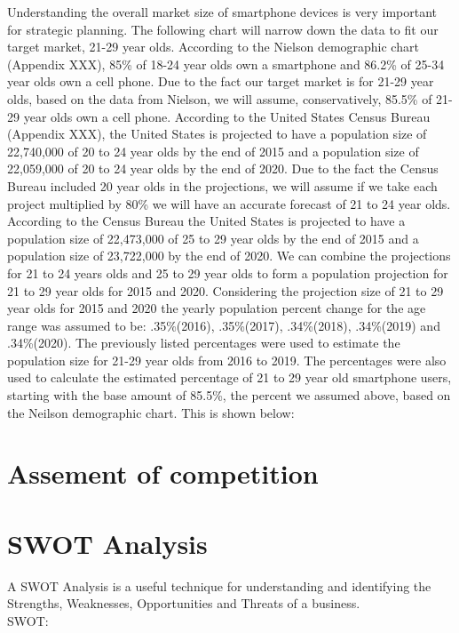 

Understanding the overall market size of smartphone devices is very important for strategic planning. The following chart will narrow down the data to fit our target market, 21-29 year olds. According to the Nielson demographic chart (Appendix XXX), 85\% of 18-24 year olds own a smartphone and 86.2\% of 25-34 year olds own a cell phone. Due to the fact our target market is for 21-29 year olds, based on the data from Nielson, we will assume, conservatively, 85.5\% of 21-29 year olds own a cell phone. According to the United States Census Bureau (Appendix XXX), the United States is projected to have a population size of 22,740,000 of 20 to 24 year olds by the end of 2015 and a population size of 22,059,000 of 20 to 24 year olds by the end of 2020. Due to the fact the Census Bureau included 20 year olds in the projections, we will assume if we take each project multiplied by 80\% we will have an accurate forecast of 21 to 24 year olds. According to the Census Bureau the United States is projected to have a population size of 22,473,000 of 25 to 29 year olds by the end of 2015 and a population size of 23,722,000 by the end of 2020. We can combine the projections for 21 to 24 years olds and 25 to 29 year olds to form a population projection for 21 to 29 year olds for 2015 and 2020. Considering the projection size of 21 to 29 year olds for 2015 and 2020 the yearly population percent change for the age range was assumed to be: .35\%(2016), .35\%(2017), .34\%(2018), .34\%(2019) and .34\%(2020). The previously listed percentages were used to estimate the population size for 21-29 year olds from 2016 to 2019. The percentages were also used to calculate the estimated percentage of 21 to 29 year old smartphone users, starting with the base amount of 85.5\%, the percent we assumed above, based on the Neilson demographic chart. This is shown below:
 



\section {Assement of competition}




\section{SWOT Analysis}

A SWOT Analysis is a useful technique for understanding and identifying the Strengths, Weaknesses, Opportunities and Threats of a business. \\
SWOT:\\

